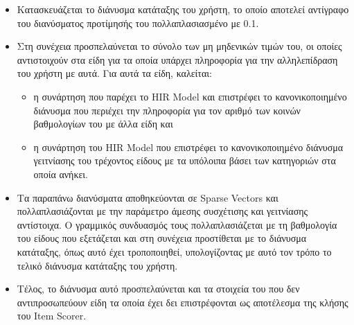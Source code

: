 \begin{itemize}
\item Κατασκευάζεται το διάνυσμα κατάταξης του χρήστη, το οποίο αποτελεί αντί\-γραφο του διανύσματος προτίμησής του πολλαπλασιασμένο με 0.1.\\
\item Στη συνέχεια προσπελαύνεται το σύνολο των μη μηδενικών τιμών του, οι οποίες αντιστοιχούν στα είδη για τα οποία υπάρχει πληροφορία για την αλληλεπίδραση του χρήστη με αυτά. Για αυτά τα είδη, καλείται:
\begin{itemize}
\item η συνάρτηση που παρέχει το {\en HIR Model} και επιστρέφει το κανονικοποιημένο διάνυσμα που περιέχει την πληροφορία για τον αριθμό των κοινών βαθμολογίων του με άλλα είδη και
\item η συνάρτηση του {\en HIR Model} που επιστρέφει το κανονικοποιημένο διά\-νυσμα γειτνίασης του τρέχοντος είδους με τα υπόλοιπα βάσει των κατηγοριών στα οποία ανήκει. 
\end{itemize}
\item Τα παραπάνω διανύσματα αποθηκεύονται σε {\en Sparse Vectors} και πολλαπλασιάζονται με την παράμετρο άμεσης συσχέτισης και γειτνίασης αντίστοιχα. Ο γραμμικός συνδυασμός τους πολλαπλασιάζεται με τη βαθμολογία του είδους που εξετάζεται και στη συνέχεια προστίθεται με το διάνυσμα κατάταξης, όπως αυτό έχει τροποποιηθεί, υπολογίζοντας με αυτό τον τρόπο το τελικό διάνυσμα κατάταξης του χρήστη. 
\item Τέλος, το διάνυσμα αυτό προσπελαύνεται και τα στοιχεία του που δεν αντι\-προσωπεύουν είδη τα οποία έχει δει επιστρέφονται ως αποτέλεσμα της κλήσης του {\en Item Scorer}.
\end{itemize}
